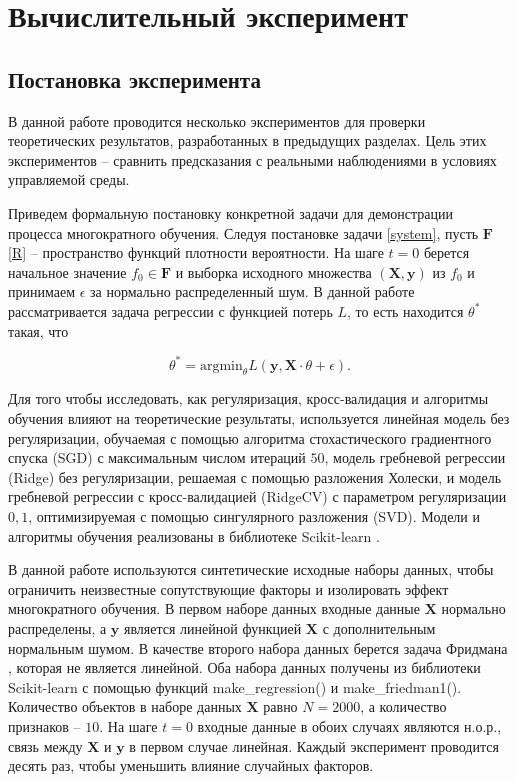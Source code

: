 \section{Вычислительный эксперимент} \label{sec:experiments}

\subsection{Постановка эксперимента}

    В данной работе проводится несколько экспериментов для проверки теоретических результатов, разработанных в предыдущих разделах. Цель этих экспериментов -- сравнить предсказания с реальными наблюдениями в условиях управляемой среды.
    
    Приведем формальную постановку конкретной задачи для демонстрации процесса многократного обучения. Следуя постановке задачи \eqref{system}, пусть $\textbf{F}$ \eqref{R} -- пространство функций плотности вероятности. На шаге $t = 0$ берется начальное значение $f_0 \in \textbf{F}$ и выборка исходного множества $(\textbf{X}, \mathbf{y})$ из $f_0$ и принимаем $\epsilon$ за нормально распределенный шум. В данной работе рассматривается задача регрессии с функцией потерь $L$, то есть находится $\theta^*$ такая, что

    \begin{equation*} \label{regression}
        \theta^* = \text{argmin}_{\theta} L (\mathbf{y}, \textbf{X} \cdot \theta + \epsilon).
    \end{equation*} 

    Для того чтобы исследовать, как регуляризация, кросс-валидация и алгоритмы обучения влияют на теоретические результаты, используется линейная модель без регуляризации, обучаемая с помощью алгоритма стохастического градиентного спуска (SGD) с максимальным числом итераций $50$, модель гребневой регрессии (Ridge) без регуляризации, решаемая с помощью разложения Холески, и модель гребневой регрессии с кросс-валидацией (RidgeCV) с параметром регуляризации $0,1$, оптимизируемая с помощью сингулярного разложения (SVD). Модели и алгоритмы обучения реализованы в библиотеке Scikit-learn \citep{pedregosa2011scikit}.

    В данной работе используются синтетические исходные наборы данных, чтобы ограничить неизвестные сопутствующие факторы и изолировать эффект многократного обучения. В первом наборе данных входные данные $\textbf{X}$ нормально распределены, а $\mathbf{y}$ является линейной функцией $\textbf{X}$ с дополнительным нормальным шумом. В качестве второго набора данных берется задача Фридмана \citep{friedman1991multivariate}, которая не является линейной.
    Оба набора данных получены из библиотеки Scikit-learn \citep{pedregosa2011scikit} с помощью функций make\_regression() и make\_friedman1().
    Количество объектов в наборе данных $\textbf{X}$ равно $ N = 2000$, а количество признаков -- $10$.
    На шаге $t=0$ входные данные в обоих случаях являются н.о.р., связь между $\textbf{X}$ и $\mathbf{y}$ в первом случае линейная. Каждый эксперимент проводится десять раз, чтобы уменьшить влияние случайных факторов. 
    
